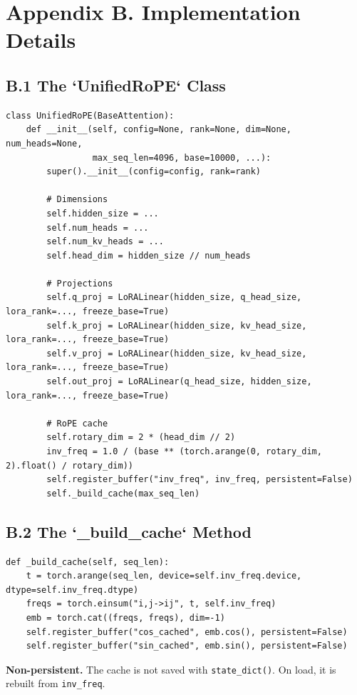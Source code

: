 
\section{Appendix B. Implementation Details}

\subsection{B.1 The `UnifiedRoPE` Class}

\begin{lstlisting}
class UnifiedRoPE(BaseAttention):
    def __init__(self, config=None, rank=None, dim=None, num_heads=None,
                 max_seq_len=4096, base=10000, ...):
        super().__init__(config=config, rank=rank)
        
        # Dimensions
        self.hidden_size = ...
        self.num_heads = ...
        self.num_kv_heads = ...
        self.head_dim = hidden_size // num_heads
        
        # Projections
        self.q_proj = LoRALinear(hidden_size, q_head_size, lora_rank=..., freeze_base=True)
        self.k_proj = LoRALinear(hidden_size, kv_head_size, lora_rank=..., freeze_base=True)
        self.v_proj = LoRALinear(hidden_size, kv_head_size, lora_rank=..., freeze_base=True)
        self.out_proj = LoRALinear(q_head_size, hidden_size, lora_rank=..., freeze_base=True)
        
        # RoPE cache
        self.rotary_dim = 2 * (head_dim // 2)
        inv_freq = 1.0 / (base ** (torch.arange(0, rotary_dim, 2).float() / rotary_dim))
        self.register_buffer("inv_freq", inv_freq, persistent=False)
        self._build_cache(max_seq_len)
\end{lstlisting}

\subsection{B.2 The `\_build\_cache` Method}

\begin{lstlisting}
def _build_cache(self, seq_len):
    t = torch.arange(seq_len, device=self.inv_freq.device, dtype=self.inv_freq.dtype)
    freqs = torch.einsum("i,j->ij", t, self.inv_freq)
    emb = torch.cat((freqs, freqs), dim=-1)
    self.register_buffer("cos_cached", emb.cos(), persistent=False)
    self.register_buffer("sin_cached", emb.sin(), persistent=False)
\end{lstlisting}

\textbf{Non-persistent.} The cache is not saved with \texttt{state\_dict()}. On load, 
it is rebuilt from \texttt{inv\_freq}.

